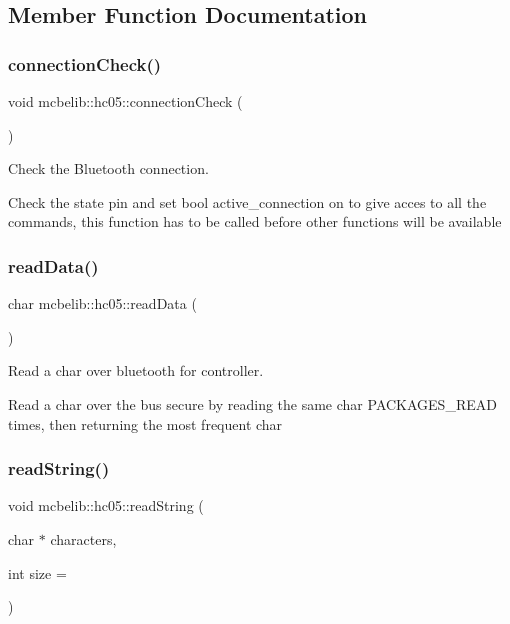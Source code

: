 \subsection{Member Function Documentation}
\mbox{\label{classmcbelib_1_1hc05_a48d294a72ba90a9cd6573da553fc7823}} 
\subsubsection{\texorpdfstring{connection\+Check()}{connectionCheck()}}
{\footnotesize\ttfamily void mcbelib\+::hc05\+::connection\+Check (\begin{DoxyParamCaption}{ }\end{DoxyParamCaption})}



Check the Bluetooth connection. 

Check the state pin and set bool active\+\_\+connection on to give acces to all the commands, this function has to be called before other functions will be available \mbox{\label{classmcbelib_1_1hc05_a718bad3e6b82582a0eb4ba5ca036b361}} 
\subsubsection{\texorpdfstring{read\+Data()}{readData()}}
{\footnotesize\ttfamily char mcbelib\+::hc05\+::read\+Data (\begin{DoxyParamCaption}{ }\end{DoxyParamCaption})}



Read a char over bluetooth for controller. 

Read a char over the bus secure by reading the same char P\+A\+C\+K\+A\+G\+E\+S\+\_\+\+R\+E\+AD times, then returning the most frequent char \mbox{\label{classmcbelib_1_1hc05_a4786907ca61b495eb7a7453f8787286e}} 
\subsubsection{\texorpdfstring{read\+String()}{readString()}}
{\footnotesize\ttfamily void mcbelib\+::hc05\+::read\+String (\begin{DoxyParamCaption}\item[{char $\ast$}]{characters,  }\item[{int}]{size = {} }\end{DoxyParamCaption})}



